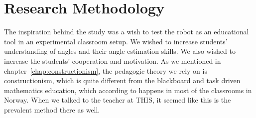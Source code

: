 \chapter{Research Methodology}
The inspiration behind the study was a wish to test the robot as an educational tool in an experimental classroom setup. We wished to increase students' understanding of angles and their angle estimation skills. We also wished to increase the students' cooperation and motivation. As we mentioned in chapter~\ref{chap:constructionism}, the pedagogic theory we rely on is constructionism, which is quite different from the blackboard and task driven mathematics education, which according to \cite{alseth2003endringer} happens in most of the classrooms in Norway. When we talked to the teacher at THIS, it seemed like this is the prevalent method there as well. 





